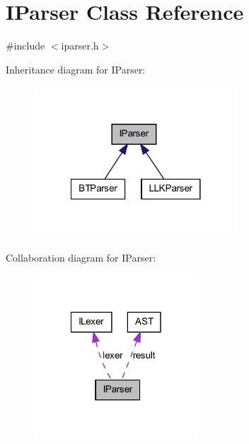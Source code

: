 \hypertarget{class_i_parser}{
\section{IParser Class Reference}
\label{class_i_parser}
}


{\ttfamily \#include $<$iparser.h$>$}



Inheritance diagram for IParser:\nopagebreak
\begin{figure}[H]
\begin{center}
\leavevmode
\includegraphics[width=216pt]{class_i_parser__inherit__graph}
\end{center}
\end{figure}


Collaboration diagram for IParser:\nopagebreak
\begin{figure}[H]
\begin{center}
\leavevmode
\includegraphics[width=174pt]{class_i_parser__coll__graph}
\end{center}
\end{figure}
